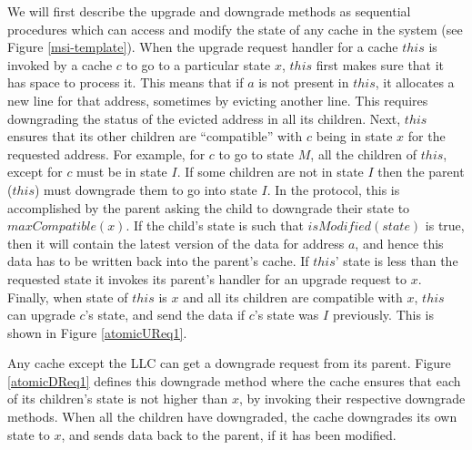 We will first describe the upgrade and downgrade methods as sequential procedures which can access and modify the state of any cache in the system (see
Figure \ref{msi-template}).  
When the upgrade request handler \uReq{} for a cache $this$ is invoked by a
cache $c$ to go to a particular state $x$, $this$ first makes sure that it has space to process it. This means that if $a$ is not present in $this$, it allocates a new line for that address, sometimes by evicting another line. This requires downgrading the status of the evicted address in all its children. Next, $this$ ensures that its
other children are ``compatible'' with $c$ being in state $x$ for the requested
address. For example, for $c$ to go to state $M$, all the children of $this$, except for $c$ must be in state $I$. If some children are not in state $I$ then the parent (\ie $this$) must downgrade them to go into state $I$. In the protocol, this is accomplished by the parent asking the child to downgrade their state to $maxCompatible(x)$. If the child's state is such that $isModified(state)$ is true, then it will contain the latest version of the data for address $a$, and hence this data has to be written back into the parent's cache.
If $this$' state is less than the requested state it invokes
its parent's handler for an upgrade request to $x$. Finally, when state of $this$ is $x$ and all its children are compatible with $x$, $this$ can upgrade
$c$'s state, and send the data if $c$'s state was $I$ previously. This is shown
in Figure \ref{atomicUReq1}.

Any cache except the LLC can get a downgrade request from its parent. Figure \ref{atomicDReq1} defines this downgrade method \dReq{} where the cache
ensures that each of its children's state is not higher than $x$, by invoking
their respective downgrade methods. When all the children have downgraded, the
cache downgrades its own state to $x$, and sends data back to the parent, if it
has been modified.




